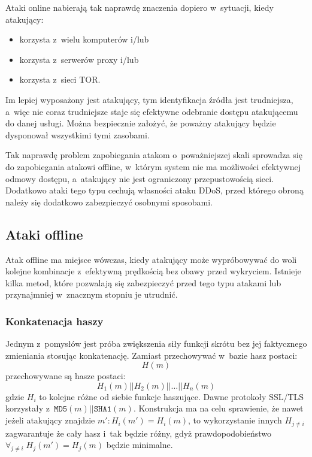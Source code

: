 Ataki online nabierają tak naprawdę znaczenia dopiero w~sytuacji, kiedy
atakujący:

\begin{itemize}

\item korzysta z~wielu komputerów i/lub
\item korzysta z~serwerów proxy i/lub
\item korzysta z~sieci TOR.

\end{itemize}

Im lepiej wyposażony jest atakujący, tym identyfikacja źródła jest trudniejsza,
a~więc nie coraz trudniejsze staje się efektywne odebranie dostępu atakującemu
do danej usługi. Można bezpiecznie założyć, że poważny atakujący będzie
dysponował wszystkimi tymi zasobami.

Tak naprawdę problem zapobiegania atakom o~poważniejszej skali sprowadza się do
zapobiegania atakowi offline, w~którym system nie ma możliwości efektywnej
odmowy dostępu, a~atakujący nie jest ograniczony przepustowością sieci.
Dodatkowo ataki tego typu cechują własności ataku DDoS, przed którego obroną
należy się dodatkowo zabezpieczyć osobnymi sposobami.

\subsection{Ataki offline}

Atak offline ma miejsce wówczas, kiedy atakujący może wypróbowywać do woli
kolejne kombinacje z~efektywną prędkością bez obawy przed wykryciem. Istnieje
kilka metod, które pozwalają się zabezpieczyć przed tego typu atakami lub
przynajmniej w~znacznym stopniu je utrudnić.

\subsubsection{Konkatenacja haszy}

Jednym z~pomysłów jest próba zwiększenia siły funkcji skrótu bez jej
faktycznego zmieniania stosując konkatenację. Zamiast przechowywać w~bazie
hasz postaci:
    $$H(m)$$
przechowywane są hasze postaci:
    $$H_1(m)||H_2(m)||\ldots||H_n(m)$$
gdzie $H_i$ to kolejne różne od siebie funkcje haszujące. Dawne protokoły
SSL/TLS korzystały z~$\mathtt{MD5}(m)||\mathtt{SHA1}(m)$. Konstrukcja ma na
celu sprawienie, że nawet jeżeli atakujący znajdzie $m' : H_i(m') = H_i(m)$, to
wykorzystanie innych $H_{j \neq i}$ zagwarantuje że cały hasz i~tak będzie
różny, gdyż prawdopodobieństwo $\forall_{j \neq i} \; H_j(m') = H_j(m)$ będzie
minimalne.

